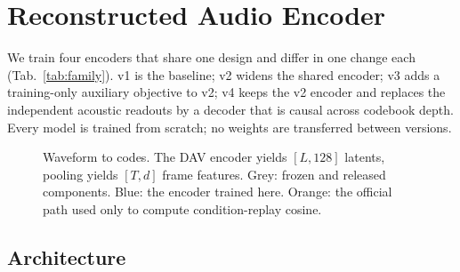 \section{Reconstructed Audio Encoder}
\label{sec:encoder}

We train four encoders that share one design and differ in one change each (Tab.~\ref{tab:family}). v1 is the baseline; v2 widens the shared encoder; v3 adds a training-only auxiliary objective to v2; v4 keeps the v2 encoder and replaces the independent acoustic readouts by a decoder that is causal across codebook depth. Every model is trained from scratch; no weights are transferred between versions.

\begin{table}[t]
\centering\small
\caption{The four encoders. Parameter counts are those of the released weights.}
\label{tab:family}
\end{table}

\begin{figure}[t]
  \centering
  \resizebox{0.92\textwidth}{!}{}
  \caption{Waveform to codes. The DAV encoder yields $[L,128]$ latents, pooling yields $[T,d]$ frame features. Grey: frozen and released components. Blue: the encoder trained here. Orange: the official path used only to compute condition-replay cosine.}
  \label{fig:pipeline}
\end{figure}

\subsection{Architecture}

